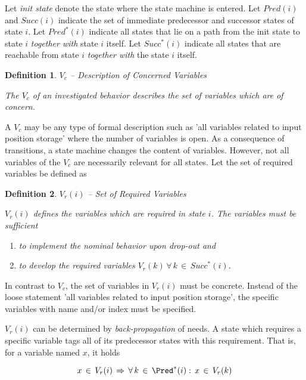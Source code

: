 \documentclass[12pt,a4paper]{scrartcl}
\newtheorem{definition}{Definition}
\begin{document}
Let \textit{init state} denote the state where the state machine is entered.
Let $Pred(i)$ and $Succ(i)$ indicate the set of immediate predecessor and
successor states of state $i$. Let $Pred^*(i)$ indicate all states that lie on
a path from the init state to state $i$ \textit{together with} state $i$
itself. Let $Succ^*(i)$ indicate all states that are reachable from state $i$
\textit{together with} the state $i$ itself.

\begin{definition}
$V_c$ -- Description of Concerned Variables

The $V_c$ of an investigated behavior describes the set of variables which
are of concern. 
\end{definition}

A $V_c$ may be any type of formal description such as 'all variables related to
input position storage' where the number of variables is open.  As a
consequence of transitions, a state machine changes the content of variables.
However, not all variables of the $V_c$ are necessarily relevant for all
states. Let the set of required variables be defined as

\begin{definition}
$V_r(i)$ -- Set of Required Variables

$V_r(i)$ defines the variables which are required in state $i$. The
variables must be sufficient

\begin{enumerate}
\item to implement the nominal behavior upon drop-out and
\item to develop the required variables $V_r(k)\,\forall\,k\,\in\,Succ^*(i)$. 
\end{enumerate}
\end{definition}

In contrast to $V_c$, the set of variables in $V_r(i)$ must be concrete.
Instead of the loose statement 'all variables related to input position
storage', the specific variables with name and/or index must be specified. 

$V_r(i)$ can be determined by \textit{back-propagation} of needs. A state which
requires a specific variable tags all of its predecessor states with this
requirement. That is, for a variable named $x$, it holds

\begin{equation}
    x\,\in\,V_r(i)\,\Rightarrow\,\forall\,k\,\in\,\Pred^*(i):\,x\,\in\,V_r(k)
\end{equation}
\end{document}

